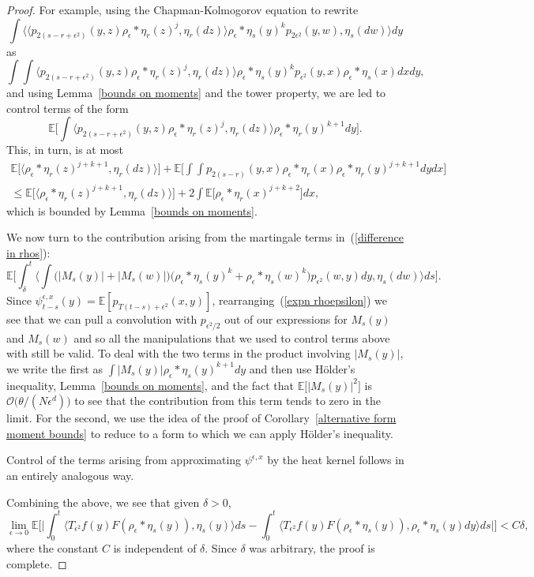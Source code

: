 \documentclass[EJP]{ejpecp} %
\newcommand{\IE}{\mathbb E}
\begin{document}
\begin{proof}
For example, using the Chapman-Kolmogorov equation to rewrite
\[
\int\Big\langle 
\big\langle p_{2(s-r+\epsilon^2)}(y,z)\rho_\epsilon*\eta_r(z)^j, \eta_r(dz)
\big\rangle
\rho_\epsilon*\eta_s(y)^k p_{2\epsilon^2}(y,w), \eta_s(dw)\Big\rangle dy
\]
as 
\[
\int\int
\big\langle p_{2(s-r+\epsilon^2)}(y,z)\rho_\epsilon*\eta_r(z)^j, \eta_r(dz)
\big\rangle
\rho_\epsilon*\eta_s(y)^k p_{\epsilon^2}(y,x)\rho_\epsilon*\eta_s(x) dx dy,
\]
and using Lemma~\ref{bounds on moments} and the tower property, we are led to 
control terms of the form
\[
\IE\Big[\int\big\langle p_{2(s-r+\epsilon^2)}(y,z)\rho_\epsilon*\eta_r(z)^j, 
\eta_r(dz)\big\rangle \rho_\epsilon*\eta_r(y)^{k+1} dy\Big].
\]
This, in turn, is at most
\begin{multline*}
\IE\Big[\big\langle \rho_\epsilon*\eta_r(z)^{j+k+1}, \eta_r(dz)\rangle\Big]
+\IE\Big[\int\int p_{2(s-r)}(y,x)\rho_\epsilon*\eta_r(x)
	\rho_\epsilon*\eta_r(y)^{j+k+1} dy dx\Big]
\\
\leq
\IE\Big[\big\langle \rho_\epsilon*\eta_r(z)^{j+k+1}, \eta_r(dz)\rangle\Big]
+2\int\IE\Big[\rho_\epsilon*\eta_r(x)^{j+k+2}\Big]dx,
\end{multline*} 
which is bounded by Lemma~\ref{bounds on moments}.

We now turn to the contribution arising from the martingale terms 
in~(\ref{difference in rhos}):
\[
\IE\Big[
\int_\delta^t\Big\langle\int 
\big(|M_s(y)|+|M_s(w)|\big)\big(\rho_\epsilon*\eta_s(y)^k+
\rho_\epsilon*\eta_s(w)^k\big)p_{\epsilon^2}(w,y)dy, \eta_s(dw)\Big\rangle ds
\Big] .
\]
Since $\psi_{t-s}^{\epsilon,x}(y)=\IE[p_{T(t-s)+\epsilon^2}(x,y)]$, 
rearranging~(\ref{expn rhoepsilon})
we see that we can pull a convolution with $p_{\epsilon^2/2}$ out of
our expressions for $M_s(y)$ and $M_s(w)$ and so all the manipulations 
that we used to control terms above with still be valid.
To deal with the two terms in the product involving $|M_s(y)|$, we write 
the first as $\int |M_s(y)|\rho_\epsilon*\eta_s(y)^{k+1}dy$ and then use
H\"older's inequality, Lemma~\ref{bounds on moments}, and the fact
that $\IE\big[|M_s(y)|^2\big]$ is ${\mathcal O}\big(\theta/(N\epsilon^d)\big)$
to see that the contribution from this term tends to zero in the limit.
For the second, we use the idea of the proof of 
Corollary~\ref{alternative form moment bounds} to reduce to a form to which
we can apply H\"older's inequality.

Control of the terms arising from approximating $\psi^{\epsilon,x}$
by the heat kernel follows in an entirely analogous way.

Combining the above, we see that given $\delta>0$, 
\[
\lim_{\epsilon\to 0}\IE\Big[\Big|\int_0^t\big\langle T_{\epsilon^2} f(y) 
F(\rho_\epsilon *\eta_s(y)), \eta_s(y) \big\rangle ds 
- \int_0^t\big\langle T_{\epsilon^2} f(y) 
F(\rho_\epsilon * \eta_s(y)), \rho_\epsilon * \eta_s(y) dy 
\big\rangle ds\Big|\Big]
<C\delta,
\]
where the constant $C$ is independent of $\delta$.
Since $\delta$ was arbitrary, the proof is complete.
\end{proof}
\end{document}
